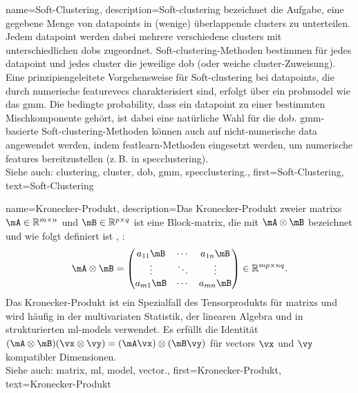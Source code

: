 {{{{
{name={Soft-Clustering}, 
	description={Soft-\gls{clustering} 
	bezeichnet die Aufgabe, eine gegebene Menge von \glspl{datapoint} in (wenige) überlappende 
	\glspl{cluster} zu unterteilen. Jedem \gls{datapoint} werden dabei mehrere verschiedene 
	\glspl{cluster} mit unterschiedlichen \glspl{dob} zugeordnet. 
	Soft-\gls{clustering}-Methoden bestimmen für jedes \gls{datapoint} und jedes \gls{cluster} 
	die jeweilige \gls{dob} (oder weiche \gls{cluster}-Zuweisung). 
	Eine prinzipiengeleitete Vorgehensweise für Soft-\gls{clustering} bei \glspl{datapoint}, 
	die durch numerische \glspl{featurevec} charakterisiert sind, erfolgt über ein \gls{probmodel} 
	wie das \gls{gmm}. 
	Die bedingte \gls{probability}, dass ein \gls{datapoint} zu einer bestimmten Mischkomponente gehört, 
	ist dabei eine natürliche Wahl für die \gls{dob}. 
	\Gls{gmm}-basierte Soft-\gls{clustering}-Methoden können auch auf nicht-numerische \gls{data} angewendet werden, 
	indem \gls{featlearn}-Methoden eingesetzt werden, um numerische \glspl{feature} bereitzustellen 
	(z.\,B. in \gls{specclustering}).\\
	Siehe auch: \gls{clustering}, \gls{cluster}, \gls{dob}, \gls{gmm}, \gls{specclustering}.},
	first={Soft-Clustering},
	text={Soft-Clustering} 
}

{name={Kronecker-Produkt}, 
	description={Das Kronecker-Produkt zweier \glspl{matrix} 
	$\mA \in \mathbb{R}^{m \times n}$ und $\mB \in \mathbb{R}^{p \times q}$ ist eine Block-\gls{matrix}, 
	die mit $\mA \otimes \mB$ bezeichnet und wie folgt definiert ist 
	\cite{GolubVanLoanBook}, \cite{HornMatAnalysis}:
	\[
	\mA \otimes \mB =
	\begin{pmatrix}
		a_{11}\mB & \cdots & a_{1n}\mB \\
		\vdots & \ddots & \vdots \\
		a_{m1}\mB & \cdots & a_{mn}\mB
	\end{pmatrix}
	\in \mathbb{R}^{mp \times nq}.
	\]
	Das Kronecker-Produkt ist ein Spezialfall des Tensorprodukts für \glspl{matrix} 
	und wird häufig in der multivariaten Statistik, der linearen Algebra 
	und in strukturierten \gls{ml}-\glspl{model} verwendet. 
	Es erfüllt die Identität $(\mA \otimes \mB)(\vx \otimes \vy) = (\mA\vx) \otimes (\mB\vy)$ 
	für \glspl{vector} $\vx$ und $\vy$ kompatibler Dimensionen.\\
	Siehe auch: \gls{matrix}, \gls{ml}, \gls{model}, \gls{vector}.},
	first={Kronecker-Produkt},
	text={Kronecker-Produkt} 
}

}}}}
